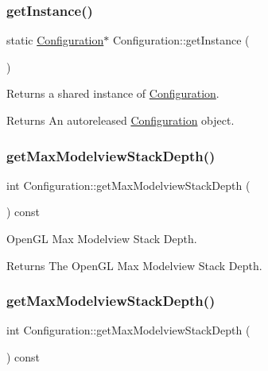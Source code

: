 \subsubsection{\texorpdfstring{get\+Instance()}{getInstance()}\hspace{0.1cm}{\footnotesize\ttfamily [2/2]}}
{\footnotesize\ttfamily static \hyperlink{classConfiguration}{Configuration}$\ast$ Configuration\+::get\+Instance (\begin{DoxyParamCaption}{ }\end{DoxyParamCaption})\hspace{0.3cm}{\ttfamily [static]}}

Returns a shared instance of \hyperlink{classConfiguration}{Configuration}.

\begin{DoxyReturn}{Returns}
An autoreleased \hyperlink{classConfiguration}{Configuration} object. 
\end{DoxyReturn}
\mbox{\label{classConfiguration_a0d3b6fb664b2b48b5090f113a34bfd11}} 
\subsubsection{\texorpdfstring{get\+Max\+Modelview\+Stack\+Depth()}{getMaxModelviewStackDepth()}\hspace{0.1cm}{\footnotesize\ttfamily [1/2]}}
{\footnotesize\ttfamily int Configuration\+::get\+Max\+Modelview\+Stack\+Depth (\begin{DoxyParamCaption}{ }\end{DoxyParamCaption}) const}

Open\+GL Max Modelview Stack Depth.

\begin{DoxyReturn}{Returns}
The Open\+GL Max Modelview Stack Depth. 
\end{DoxyReturn}
\mbox{\label{classConfiguration_a0d3b6fb664b2b48b5090f113a34bfd11}} 
\subsubsection{\texorpdfstring{get\+Max\+Modelview\+Stack\+Depth()}{getMaxModelviewStackDepth()}\hspace{0.1cm}{\footnotesize\ttfamily [2/2]}}
{\footnotesize\ttfamily int Configuration\+::get\+Max\+Modelview\+Stack\+Depth (\begin{DoxyParamCaption}{ }\end{DoxyParamCaption}) const}

